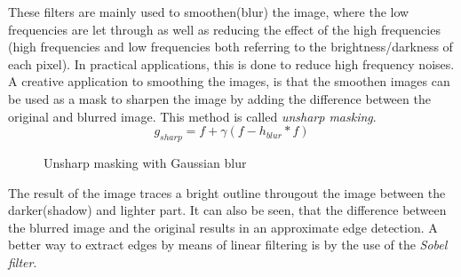 \documentclass[twoside,a4paper,article]{combine}
\begin{document}
These filters are mainly used to smoothen(blur) the image, where the low frequencies are let through as well as reducing the effect of the high frequencies (high frequencies and low frequencies both referring to
the brightness/darkness of each pixel). In practical applications, this is done to reduce high frequency noises.
A creative application to smoothing the images, is that the smoothen images can be used as a mask to sharpen the image by adding the difference between the original and blurred image.
This method is called \emph{unsharp masking}\cite{Szeliski_2022}.
\[
  g_{sharp} = f + \gamma(f - h_{blur} \ast f)  
\]
\begin{minipage}{\textwidth}\begin{figure}[H]
    \centering
    \caption{Unsharp masking with Gaussian blur}\label{fig:unsharp_mask}
\end{figure}\end{minipage}
The result of the image traces a bright outline througout the image between the darker(shadow) and lighter part. It can also be seen, that
the difference between the blurred image and the original results in an approximate edge detection. A better way to extract edges by means of linear filtering is
by the use of the \emph{Sobel filter}. \cite{Szeliski_2022}
\end{document}
